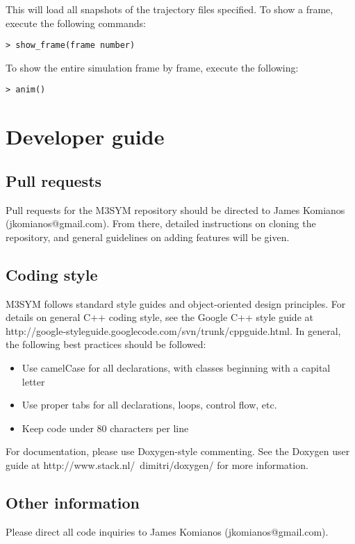 \documentclass[11pt, oneside]{article}   	%
\begin{document}
\noindent This will load all snapshots of the trajectory files specified. To show a frame, execute the following commands:\newline

\texttt{> show\_frame(frame number)}\newline

\noindent To show the entire simulation frame by frame, execute the following:\newline

\texttt{> anim()}

\section{Developer guide}

\subsection{Pull requests}

Pull requests for the M3SYM repository should be directed to James Komianos (jkomianos@gmail.com). From there, detailed instructions on cloning the repository, and general guidelines on adding features will be given.

\subsection{Coding style}

M3SYM follows standard style guides and object-oriented design principles. For details on general C++ coding style, see the Google C++ style guide at http://google-styleguide.googlecode.com/svn/trunk/cppguide.html. In general, the following best practices should be followed:

\begin{itemize}

\item Use camelCase for all declarations, with classes beginning with a capital letter
\item Use proper tabs for all declarations, loops, control flow, etc.
\item Keep code under 80 characters per line

\end{itemize}

\noindent For documentation, please use Doxygen-style commenting. See the Doxygen user guide at 
http://www.stack.nl/~dimitri/doxygen/ for more information.

\subsection{Other information}

Please direct all code inquiries to James Komianos (jkomianos@gmail.com).
\end{document}
